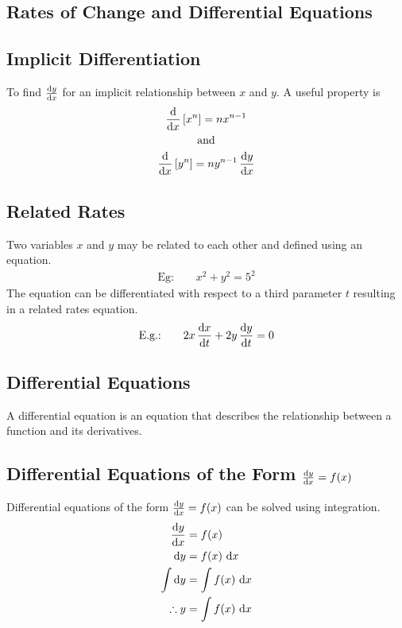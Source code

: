 \documentclass[10pt, a4paper, titlepage]{article}
\begin{document}
\begin{multicols*}{3}
	\hrulefill

	\section{Rates of Change and Differential Equations}
	\subsection{Implicit Differentiation}
	To find $\dv{y}{x}$ for an implicit relationship between $x$ and $y$. A useful property is
	\begin{gather}
		\begin{align}
			\dv{x}\left[x^n\right]=nx^{n-1}
		\end{align}\\
		\text{and}\\
		\begin{align}
			\dv{x}\left[y^n\right]=ny^{n-1}\, \dv{y}{x}
		\end{align}
	\end{gather}

	\dotfill
	\subsection{Related Rates}
	Two variables $x$ and $y$ may be related to each other and defined using an equation.
	\begin{align}
		\text{Eg:}\qquad x^2+y^2=5^2
	\end{align}
	The equation can be differentiated with respect to a third parameter $t$ resulting in a related rates equation.
	\begin{align}
		\text{E.g.:}\qquad 2x\, \dv{x}{t}+2y\, \dv{y}{t}=0
	\end{align}

	\dotfill
	\subsection{Differential Equations}
	A differential equation is an equation that describes the relationship between a function and its derivatives.

	\dotfill
	\subsection{Differential Equations of the Form $\dv{y}{x}=f(x)$}
	Differential equations of the form $\dv{y}{x}=f(x)$ can be solved using integration.
	\begin{align}
		\dv{y}{x}&=f(x)\\
		\dd{y}&=f(x)\, \dd{x}\\
		\int \dd{y}&=\int f(x)\, \dd{x}\\
		\therefore y&=\int f(x)\, \dd{x}
	\end{align}


\end{multicols*}
\end{document}
